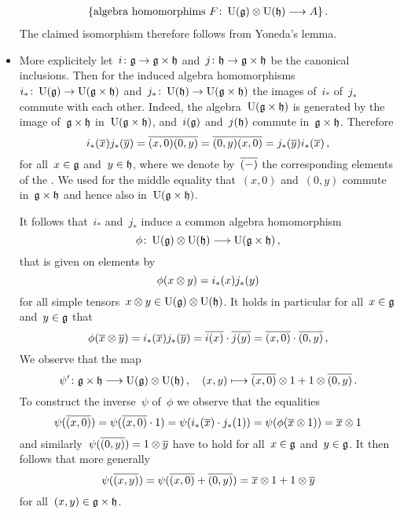 \begin{example}
\begin{itemize}
\begin{align*}
        \{ \text{algebra homomorphims~$F \colon \Univ(\glie) \tensor \Univ(\hlie) \to A$} \}  \,.
      \end{align*}
      The claimed isomorphism therefore follows from Yoneda’s lemma.
    \item
      More explicitely let~$i \colon \glie \to \glie \times \hlie$ and~$j \colon \hlie \to \glie \times \hlie$ be the canonical inclusions.
      Then for the induced algebra homomorphisms~$i_* \colon \Univ(\glie) \to \Univ(\glie \times \hlie)$ and~$j_* \colon \Univ(\hlie) \to \Univ(\glie \times \hlie)$ the images of~$i_*$ of~$j_*$ commute with each other.
      Indeed, the algebra~$\operatorname{U}(\mathfrak{g} \times \mathfrak{h})$ is generated by the image of~$\mathfrak{g} \times \mathfrak{h}$ in~$\operatorname{U}(\mathfrak{g} \times \mathfrak{h})$, and~$i(\mathfrak{g})$ and~$j(\mathfrak{h})$ commute in~$\mathfrak{g} \times \mathfrak{h}$.
      Therefore
      \[
        i_*(\overline{x}) j_*(\overline{y})
        =
        \overline{(x,0)} \overline{(0,y)}
        =
        \overline{(0,y)} \overline{(x,0)}
        =
        j_*(\overline{y}) i_*(\overline{x}) \,,
      \]
      for all~$x \in \mathfrak{g}$ and~$y \in \mathfrak{h}$, where we denote by~$\overline{(-)}$ the corresponding elements of the {\uas}.
      We used for the middle equality that~$(x,0)$ and~$(0,y)$ commute in~$\mathfrak{g} \times \mathfrak{h}$ and hence also in~$\operatorname{U}(\mathfrak{g} \times \mathfrak{h})$.
      
      It follows that~$i_*$ and~$j_*$ induce a common algebra homomorphism
      \[
        \phi
        \colon
        \Univ(\glie) \tensor \Univ(\hlie)
        \to
        \Univ(\glie \times \hlie) \,,
      \]
      that is given on elements by
      \[
        \phi(x \otimes y)
        =
        i_*(x) j_*(y)
      \]
      for all simple tensors~$x \otimes y \in \operatorname{U}(\mathfrak{g}) \otimes \operatorname{U}(\mathfrak{h})$.
      It holds in particular for all~$x \in \mathfrak{g}$ and~$y \in \mathfrak{g}$ that
      \[
        \phi(\overline{x} \otimes \overline{y})
        =
        i_*(\overline{x}) j_*(\overline{y})
        =
        \overline{i(x)} \cdot \overline{j(y)}
        =
        \overline{(x,0)} \cdot \overline{(0,y)}  \,,
      \]
      We observe that the map
      \[
        \psi'
        \colon
        \glie \times \hlie
        \to
        \Univ(\glie) \tensor \Univ(\hlie) \,,
        \quad
        (x,y)
        \mapsto
        \class{(x,0)} \tensor 1 + 1 \tensor \class{(0,y)} \,.
      \]
      To construct the inverse~$\psi$ of~$\phi$ we observe that the equalities
      \[
        \psi( \overline{(x,0)} )
        =
        \psi( \overline{(x,0)} \cdot 1 )
        =
        \psi( i_*(\overline{x}) \cdot j_*(1) )
        =
        \psi( \phi(\overline{x} \otimes 1) )
        =
        \overline{x} \otimes 1
      \]
      and similarly~$\psi( \overline{(0,y)} ) = 1 \otimes \overline{y}$ have to hold for all~$x \in \mathfrak{g}$ and~$y \in \mathfrak{g}$.
      It then follows that more generally
      \[
        \psi( \overline{(x,y)} )
        =
        \psi( \overline{(x,0)} + \overline{(0,y)} )
        =
        \overline{x} \otimes 1 + 1 \otimes \overline{y}
      \]
      for all~$(x,y) \in \mathfrak{g} \times \mathfrak{h}$.
      

\end{itemize}
\end{example}
